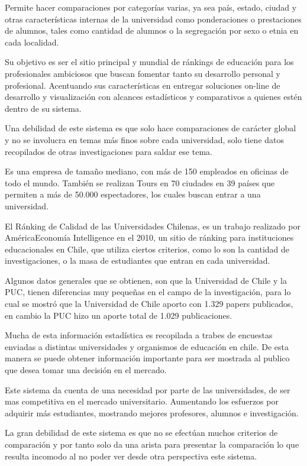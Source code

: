 \documentclass[a4paper,12pt,openany,oneside]{book}
\begin{document}
Permite hacer comparaciones por categorías varias, ya sea país, estado, ciudad y otras características internas de la universidad como ponderaciones o prestaciones de alumnos, tales como cantidad de alumnos o la segregación por sexo o etnia en cada localidad.

Su objetivo es ser el sitio principal y mundial de ránkings de educación para los profesionales ambiciosos que buscan fomentar tanto su desarrollo personal y profesional. Acentuando sus características en entregar soluciones on-line de desarrollo y visualización con alcances estadísticos y comparativos a quienes estén dentro de su sistema.

Una debilidad de este sistema es que solo hace comparaciones de carácter global y no se involucra en temas más finos sobre cada universidad, solo tiene datos recopilados de otras investigaciones para saldar ese tema.

Es una empresa de tamaño mediano, con más de 150 empleados en oficinas de todo el mundo. También se realizan Tours en 70 ciudades en 39 países que permiten a más de 50.000 espectadores, los cuales buscan entrar a una universidad\cite{data2}.

El Ránking de Calidad de las Universidades Chilenas, es un trabajo realizado por AméricaEconomía Intelligence en el 2010, un sitio de ránking para instituciones educacionales en Chile, que utiliza ciertos criterios, como lo son la cantidad de investigaciones, o la masa de estudiantes que entran en cada universidad.

Algunos datos generales que se obtienen, son que la Universidad de Chile y la PUC, tienen diferencias muy pequeñas en el campo de la investigación, para lo cual se mostró que la Universidad de Chile aporto con 1.329 papers publicados, en cambio la PUC hizo un aporte total de 1.029 publicaciones.

Mucha de esta información estadística es recopilada a trabes de encuestas enviadas a distintas universidades y organismos de educación en chile. De esta manera se puede obtener información importante para ser mostrada al publico que desea tomar una decisión en el mercado.

Este sistema da cuenta de una necesidad por parte de las universidades, de ser mas competitiva en el mercado universitario. Aumentando los esfuerzos por adquirir más estudiantes, mostrando mejores profesores, alumnos e investigación.

La gran debilidad de este sistema es que no se efectúan muchos criterios de comparación y por tanto solo da una arista para presentar la comparación lo que resulta incomodo al no poder ver desde otra perspectiva este sistema.
\end{document}
